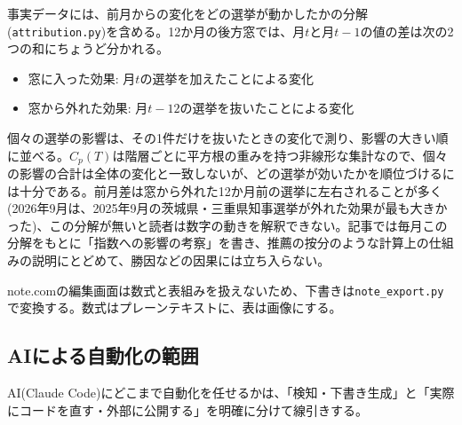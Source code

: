 \documentclass[a4paper,11pt]{ltjsarticle}
\begin{document}
事実データには、前月からの変化をどの選挙が動かしたかの分解(\texttt{attribution.py})を含める。12か月の後方窓では、月$t$と月$t-1$の値の差は次の2つの和にちょうど分かれる。
\begin{itemize}
  \item 窓に入った効果: 月$t$の選挙を加えたことによる変化
  \item 窓から外れた効果: 月$t-12$の選挙を抜いたことによる変化
\end{itemize}
個々の選挙の影響は、その1件だけを抜いたときの変化で測り、影響の大きい順に並べる。$C_p(T)$は階層ごとに平方根の重みを持つ非線形な集計なので、個々の影響の合計は全体の変化と一致しないが、どの選挙が効いたかを順位づけるには十分である。前月差は窓から外れた12か月前の選挙に左右されることが多く(2026年9月は、2025年9月の茨城県・三重県知事選挙が外れた効果が最も大きかった)、この分解が無いと読者は数字の動きを解釈できない。記事では毎月この分解をもとに「指数への影響の考察」を書き、推薦の按分のような計算上の仕組みの説明にとどめて、勝因などの因果には立ち入らない。

note.comの編集画面は数式と表組みを扱えないため、下書きは\texttt{note\_export.py}で変換する。数式はプレーンテキストに、表は画像にする。

\subsection{AIによる自動化の範囲}
\label{sec:ai-automation-scope}

AI(Claude Code)にどこまで自動化を任せるかは、「検知・下書き生成」と「実際にコードを直す・外部に公開する」を明確に分けて線引きする。
\end{document}
